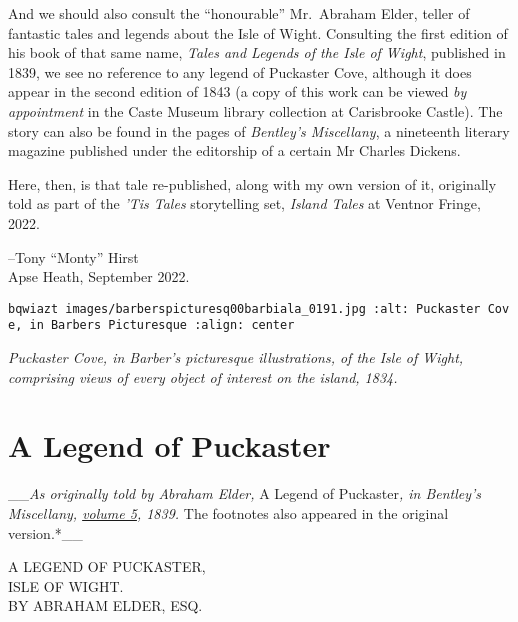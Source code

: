 \documentclass[
  12pt,
  a5paper,
  twoside]{book}
\let\oldtexttt\texttt        %
\renewcommand{\texttt}[1]{\footnotesize\oldtexttt{#1}}
\begin{document}
And we should also consult the ``honourable'' Mr.~Abraham Elder, teller
of fantastic tales and legends about the Isle of Wight. Consulting the
first edition of his book of that same name, \emph{Tales and Legends of
the Isle of Wight}, published in 1839, we see no reference to any legend
of Puckaster Cove, although it does appear in the second edition of 1843
(a copy of this work can be viewed \emph{by appointment} in the Caste
Museum library collection at Carisbrooke Castle). The story can also be
found in the pages of \emph{Bentley's Miscellany}, a nineteenth literary
magazine published under the editorship of a certain Mr Charles Dickens.

Here, then, is that tale re-published, along with my own version of it,
originally told as part of the \emph{'Tis Tales} storytelling set,
\emph{Island Tales} at Ventnor Fringe, 2022.

--Tony ``Monty'' Hirst\\
Apse Heath, September 2022.

\let\thefootnote\relax{}

\texttt{bqwiazt\ images/barberspicturesq00barbiala\_0191.jpg\ :alt:\ Puckaster\ Cove,\ in\ Barber\textquotesingle{}s\ Picturesque\ :align:\ center}

\emph{Puckaster Cove, in Barber's picturesque illustrations, of the Isle
of Wight, comprising views of every object of interest on the island,
1834.}


\chapter{A Legend of Puckaster}\label{a-legend-of-puckaster}

\_\_\emph{As originally told by Abraham Elder, }A Legend of
Puckaster\emph{, in Bentley's Miscellany,
\href{https://archive.org/details/sim_bentleys-miscellany_1839-07_6/page/368/mode/2up}{volume
5}, 1839. }The footnotes also appeared in the original version.*\_\_

A LEGEND OF PUCKASTER,\\
ISLE OF WIGHT.\\
BY ABRAHAM ELDER, ESQ.
\end{document}
